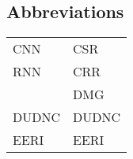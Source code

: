 \begin{center}
    \section*{Abbreviations}
    \begin{table}[h]
        \centering
        \begin{tabular}{ll}
            CNN   & \hspace{2.3 in} CSR   \\
            RNN   & \hspace{2.3 in} CRR   \\
               & \hspace{2.3 in} DMG   \\
            DUDNC & \hspace{2.3 in} DUDNC \\
            EERI  & \hspace{2.3 in} EERI  \\
        \end{tabular}
    \end{table}
\end{center}

